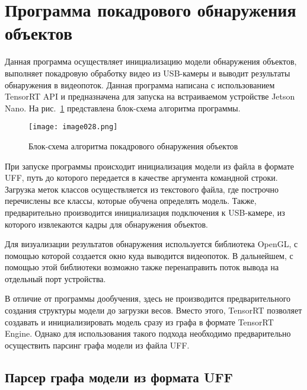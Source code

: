 \section{Программа покадрового обнаружения объектов}

Данная программа осуществляет инициализацию модели обнаружения объектов, выполняет покадровую обработку видео из USB-камеры и выводит результаты обнаружения в видеопоток. Данная программа написана с использованием TensorRT API и предназначена для запуска на встраиваемом устройстве Jetson Nano. На рис.~\ref{fig:image028} представлена блок-схема алгоритма программы.

\begin{figure}[htbp]
\centering
\texttt{[image: image028.png]}
\caption{Блок-схема алгоритма покадрового обнаружения объектов}%
\label{fig:image028}
\end{figure}

При запуске программы происходит инициализация модели из файла в формате UFF, путь до которого передается в качестве аргумента командной строки. Загрузка меток классов осуществляется из текстового файла, где построчно перечислены все классы, которые обучена определять модель. Также, предварительно производится инициализация подключения к USB-камере, из которого извлекаются кадры для обнаружения объектов.

Для визуализации результатов обнаружения используется библиотека OpenGL, с помощью которой создается окно куда выводится видеопоток. В дальнейшем, с помощью этой библиотеки возможно также перенаправить поток вывода на отдельный порт устройства.

В отличие от программы дообучения, здесь не производится предварительного создания структуры модели до загрузки весов. Вместо этого, TensorRT позволяет создавать и инициализировать модель сразу из графа в формате TensorRT Engine. Однако для использования такого подхода необходимо предварительно осуществить парсинг графа модели из файла UFF.

\subsection{Парсер графа модели из формата UFF}

